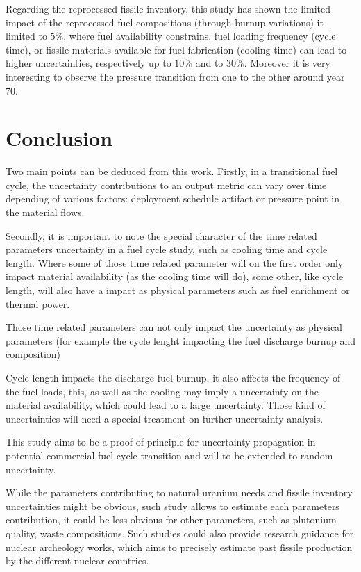 \documentclass{anstrans}
\begin{document}
Regarding the reprocessed fissile inventory, this study has shown the limited
impact of the reprocessed fuel compositions (through burnup variations) it
limited to $5\%$, where fuel availability constrains, fuel loading frequency (cycle
time), or fissile materials available for fuel fabrication (cooling time) can lead to higher
uncertainties, respectively up to $10\%$ and to $30\%$. Moreover it is very
interesting to observe the pressure transition from one to the other around
year 70.


\section{Conclusion}

Two main points can be deduced from this work.  Firstly, in a transitional
fuel cycle, the uncertainty contributions to an output metric can vary over time
depending of various factors: deployment schedule artifact or pressure point in
the material flows.

Secondly, it is important to note the special character of the time related
parameters uncertainty in a fuel cycle study, such as cooling time and cycle
length. Where some of those time related parameter will on the first order only
impact material availability (as the cooling time will do), some other, like
cycle length, will also have a impact as physical parameters such as fuel enrichment or thermal
power. 

Those time related parameters can not only impact the uncertainty as
physical parameters (for example the cycle lenght impacting the fuel discharge
burnup and composition) 


Cycle length impacts the discharge fuel burnup, it also affects
the frequency of the fuel loads, this, as well as the cooling may imply a
uncertainty on the material availability, which could lead to a large
uncertainty.  Those kind of uncertainties will need a special treatment on further
uncertainty analysis.

This study aims to be a proof-of-principle for uncertainty propagation in
potential commercial fuel cycle transition and will to be extended to random
uncertainty.

While the parameters contributing to natural uranium needs and fissile inventory
uncertainties might be obvious, such study allows to estimate each parameters
contribution, it could be less obvious for other parameters, such as
plutonium quality, waste compositions.  Such studies could also provide research
guidance for nuclear archeology works, which aims to precisely estimate past
fissile production by the different nuclear countries.
\end{document}
